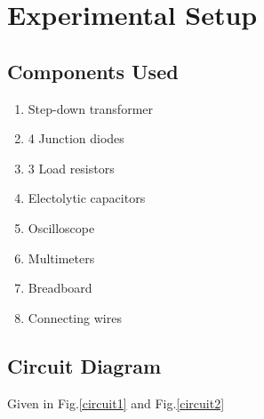 \section{Experimental Setup}

\subsection{Components Used}
\begin{enumerate}
    \item Step-down transformer
    \item 4 Junction diodes
    \item 3 Load resistors
    \item Electolytic capacitors
    \item Oscilloscope
    \item Multimeters
    \item Breadboard
    \item Connecting wires
\end{enumerate}

\subsection{Circuit Diagram}

Given in Fig.\ref{circuit1} and Fig.\ref{circuit2}